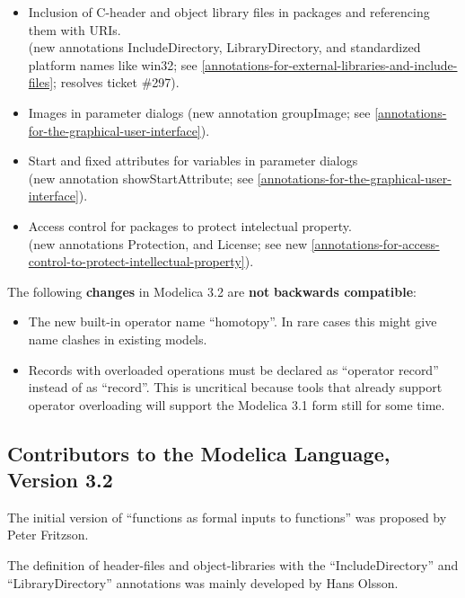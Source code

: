 \documentclass[10pt,a4paper]{report}
\def\doublelabel#1{\label{#1}\hypertarget{#1}{}}
\begin{document}
\begin{itemize}
  \begin{itemize}
  \item
    Inclusion of C-header and object library files in packages and
    referencing them with URIs.\\
    (new annotations IncludeDirectory, LibraryDirectory, and
    standardized platform names like win32; see \ref{annotations-for-external-libraries-and-include-files}; resolves
    ticket \#297).
  \item
    Images in parameter dialogs (new annotation groupImage; see 
    \ref{annotations-for-the-graphical-user-interface}).
  \item
    Start and fixed attributes for variables in parameter dialogs\\
    (new annotation showStartAttribute; see \ref{annotations-for-the-graphical-user-interface}).
  \item
    Access control for packages to protect intelectual property.\\
    (new annotations Protection, and License; see new \ref{annotations-for-access-control-to-protect-intellectual-property}).
  \end{itemize}
\end{itemize}

The following \textbf{changes} in Modelica 3.2 are \textbf{not}
\textbf{backwards compatible}:

\begin{itemize}
\item
  The new built-in operator name ``homotopy''. In rare cases this might
  give name clashes in existing models.
\item
  Records with overloaded operations must be declared as ``operator
  record'' instead of as ``record''. This is uncritical because tools
  that already support operator overloading will support the Modelica
  3.1 form still for some time.
\end{itemize}

\subsection{Contributors to the Modelica Language, Version 3.2}\doublelabel{contributors-to-the-modelica-language-version-3-2}

The initial version of ``functions as formal inputs to functions'' was
proposed by Peter Fritzson.

The definition of header-files and object-libraries with the
``IncludeDirectory'' and ``LibraryDirectory'' annotations was mainly
developed by Hans Olsson.
\end{document}
